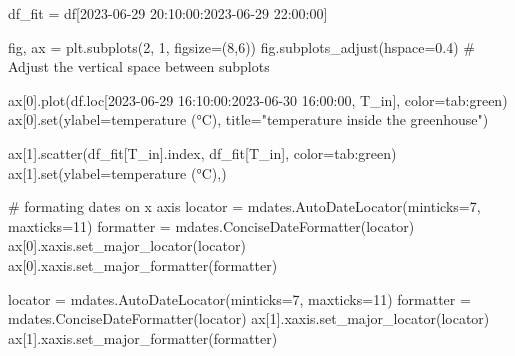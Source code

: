 \documentclass[
  letterpaper,
  DIV=11,
  numbers=noendperiod,
  oneside]{scrreprt}
\newenvironment{Shaded}{\begin{snugshade}}{\end{snugshade}}
\newcommand{\BuiltInTok}[1]{\textcolor[rgb]{0.00,0.23,0.31}{#1}}
\newcommand{\CommentTok}[1]{\textcolor[rgb]{0.37,0.37,0.37}{#1}}
\newcommand{\DecValTok}[1]{\textcolor[rgb]{0.68,0.00,0.00}{#1}}
\newcommand{\FloatTok}[1]{\textcolor[rgb]{0.68,0.00,0.00}{#1}}
\newcommand{\NormalTok}[1]{\textcolor[rgb]{0.00,0.23,0.31}{#1}}
\newcommand{\OperatorTok}[1]{\textcolor[rgb]{0.37,0.37,0.37}{#1}}
\newcommand{\StringTok}[1]{\textcolor[rgb]{0.13,0.47,0.30}{#1}}
\begin{document}
\begin{Shaded}
\begin{Highlighting}[]
\NormalTok{df\_fit }\OperatorTok{=}\NormalTok{ df[}\StringTok{\textquotesingle{}2023{-}06{-}29 20:10:00\textquotesingle{}}\NormalTok{:}\StringTok{\textquotesingle{}2023{-}06{-}29 22:00:00\textquotesingle{}}\NormalTok{]}

\NormalTok{fig, ax }\OperatorTok{=}\NormalTok{ plt.subplots(}\DecValTok{2}\NormalTok{, }\DecValTok{1}\NormalTok{, figsize}\OperatorTok{=}\NormalTok{(}\DecValTok{8}\NormalTok{,}\DecValTok{6}\NormalTok{))}
\NormalTok{fig.subplots\_adjust(hspace}\OperatorTok{=}\FloatTok{0.4}\NormalTok{)  }\CommentTok{\# Adjust the vertical space between subplots}

\NormalTok{ax[}\DecValTok{0}\NormalTok{].plot(df.loc[}\StringTok{\textquotesingle{}2023{-}06{-}29 16:10:00\textquotesingle{}}\NormalTok{:}\StringTok{\textquotesingle{}2023{-}06{-}30 16:00:00\textquotesingle{}}\NormalTok{, }\StringTok{\textquotesingle{}T\_in\textquotesingle{}}\NormalTok{], color}\OperatorTok{=}\StringTok{\textquotesingle{}tab:green\textquotesingle{}}\NormalTok{)}
\NormalTok{ax[}\DecValTok{0}\NormalTok{].}\BuiltInTok{set}\NormalTok{(ylabel}\OperatorTok{=}\StringTok{\textquotesingle{}temperature (°C)\textquotesingle{}}\NormalTok{,}
\NormalTok{       title}\OperatorTok{=}\StringTok{"temperature inside the greenhouse"}\NormalTok{)}

\NormalTok{ax[}\DecValTok{1}\NormalTok{].scatter(df\_fit[}\StringTok{\textquotesingle{}T\_in\textquotesingle{}}\NormalTok{].index, df\_fit[}\StringTok{\textquotesingle{}T\_in\textquotesingle{}}\NormalTok{], color}\OperatorTok{=}\StringTok{\textquotesingle{}tab:green\textquotesingle{}}\NormalTok{)}
\NormalTok{ax[}\DecValTok{1}\NormalTok{].}\BuiltInTok{set}\NormalTok{(ylabel}\OperatorTok{=}\StringTok{\textquotesingle{}temperature (°C)\textquotesingle{}}\NormalTok{,)}

\CommentTok{\# formating dates on x axis}
\NormalTok{locator }\OperatorTok{=}\NormalTok{ mdates.AutoDateLocator(minticks}\OperatorTok{=}\DecValTok{7}\NormalTok{, maxticks}\OperatorTok{=}\DecValTok{11}\NormalTok{)}
\NormalTok{formatter }\OperatorTok{=}\NormalTok{ mdates.ConciseDateFormatter(locator)}
\NormalTok{ax[}\DecValTok{0}\NormalTok{].xaxis.set\_major\_locator(locator)}
\NormalTok{ax[}\DecValTok{0}\NormalTok{].xaxis.set\_major\_formatter(formatter)}

\NormalTok{locator }\OperatorTok{=}\NormalTok{ mdates.AutoDateLocator(minticks}\OperatorTok{=}\DecValTok{7}\NormalTok{, maxticks}\OperatorTok{=}\DecValTok{11}\NormalTok{)}
\NormalTok{formatter }\OperatorTok{=}\NormalTok{ mdates.ConciseDateFormatter(locator)}
\NormalTok{ax[}\DecValTok{1}\NormalTok{].xaxis.set\_major\_locator(locator)}
\NormalTok{ax[}\DecValTok{1}\NormalTok{].xaxis.set\_major\_formatter(formatter)}
\end{Highlighting}
\end{Shaded}
\end{document}

